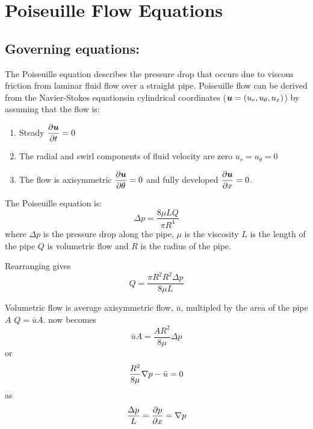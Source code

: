 \section{Poiseuille Flow Equations}

\subsection{Governing equations:}

The Poiseuille equation describes the pressure drop that occurs due to viscous
friction from laminar fluid flow over a straight pipe. Poiseuille flow can be
derived from the Navier-Stokes equationsin cylindrical coordinates
($\boldsymbol{u}=\left( u_{r},u_{\theta},u_{x} \right)$) by assuming that the flow
is: \begin{enumerate} \setlength{\itemsep}{1pt} \setlength{\parskip}{0pt}
  \setlength{\parsep}{0pt}
\item Steady \ie $ \dfrac{\partial \boldsymbol{u}}{\partial t} =0$
\item The radial and swirl components of fluid velocity are zero \ie
  $u_{r}=u_{\theta}=0$ 
\item The flow is axisymmetric \ie $ \dfrac{\partial \boldsymbol{u}}{\partial \theta} =0$ and fully developed
  \ie $ \dfrac{\partial \boldsymbol{u}}{\partial x} =0$.
\end{enumerate}

The Poiseuille equation is:
\begin{equation}
  \boxed{
    \Delta{p}=\dfrac{8\mu LQ}{\pi R^{4}}
  }
  \label{eqn:Poiseuille_equation}
\end{equation}
where $\Delta{p}$ is the pressure drop along the pipe, $\mu$ is the viscosity $L$
is the length of the pipe $Q$ is volumetric flow and $R$ is the radius of the
pipe. 

Rearranging  gives
\begin{equation}
  Q=\dfrac{\pi R^{2}R^{2}\Delta{p}}{8\mu L}
\end{equation}

Volumetric flow is average axisymmetric flow, $\bar{u}$, multipled by the area
of the pipe $A$ \ie $Q=\bar{u}A$.  now becomes
\begin{equation}
  \bar{u}A=\dfrac{AR^{2}}{8\mu}\Delta{p}
\end{equation}
or 
\begin{equation}
  \dfrac{R^{2}}{8\mu}\gradient{}{p}-\bar{u}=0
\end{equation}
as
\begin{equation}
  \dfrac{\Delta p}{L}=\delby{p}{x}=\gradient{}{p}
\end{equation}

